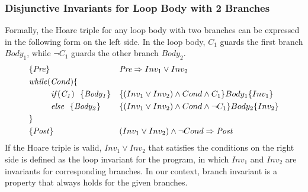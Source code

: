 \vspace{-0.2cm}
\subsubsection{Disjunctive Invariants for Loop Body with 2 Branches}
Formally, the Hoare triple for any loop body with two branches can be expressed in the following form on the left side.
In the loop body, $\mathit{C_1}$ guards the first branch $\mathit{Body_1}$, while $\mathit{\neg C_1}$ guards the other branch $\mathit{Body_2}$.
\begin{align}
&\{\mathit{Pre}\} && \emph{Pre} \Rightarrow \emph{$Inv_1$} \vee \emph{$Inv_2$} \label{ext:inv:pre}\\
&\mathit{while} (\mathit{Cond}) \{ && \\
&~~~~~~~~\mathit{if} (\mathit{C_1}) ~~\{ \mathit{Body_1} \} && \{(\emph{$Inv_1$} \vee \emph{$Inv_2$}) \wedge Cond \wedge C_1\} Body_1 \{\emph{$Inv_1$}\} \label{ext:inv:loop:b1}\\
&~~~~~~~~\mathit{else} ~~\{ \mathit{Body_2} \} && \{(\emph{$Inv_1$} \vee \emph{$Inv_2$}) \wedge Cond \wedge \neg C_1\} Body_2 \{\emph{$Inv_2$}\} \label{ext:inv:loop:b2}\\
&\} && \\
&\{\mathit{Post}\} && (\emph{$Inv_1$} \vee \emph{$Inv_2$}) \wedge \neg Cond \Rightarrow \emph{Post} \label{ext:inv:post}
\end{align}
If the Hoare triple is valid, $Inv_1 \vee Inv_2$ that satisfies the conditions on the right side is defined as the loop invariant for the program,
in which $Inv_1$ and $Inv_2$ are invariants for corresponding branches.
In our context, branch invariant is a property that always holds for the given branches.



